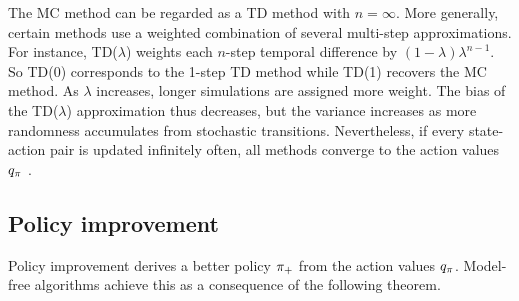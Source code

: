 The MC method can be regarded as a TD method with $n = \infty$.
More generally, certain methods use a weighted combination of several multi-step approximations.
For instance, TD($\lambda$) weights each $n$-step temporal difference by $(1-\lambda) \lambda^{n-1}$. So TD(0) corresponds to the 1-step TD method while TD(1) recovers the MC method.
As $\lambda$ increases, longer simulations are assigned more weight. The bias of the TD($\lambda$) approximation thus decreases, but the variance increases as more randomness accumulates from stochastic transitions.
Nevertheless, if every state-action pair is updated infinitely often, all methods converge to the action values $q_\pi$ \citep{Sutton1988LearningDifferences, Dayan1992The}.






\subsection{Policy improvement}

Policy improvement derives a better policy $\pi_+$ from the action values $q_\pi$. Model-free algorithms achieve this as a consequence of the following theorem.



